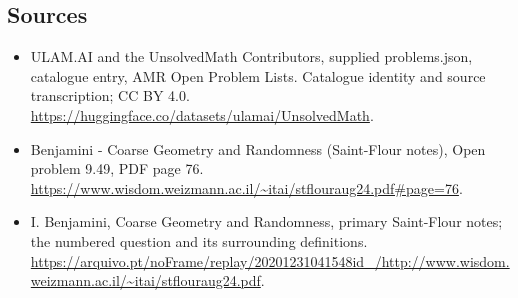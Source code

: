 \documentclass[11pt,a4paper]{article}
\begin{document}
\subsection{Sources}
\begin{itemize}
\item[S1] ULAM.AI and the UnsolvedMath Contributors, supplied problems.json, catalogue entry, AMR Open Problem Lists. Catalogue identity and source transcription; CC BY 4.0.
\url{https://huggingface.co/datasets/ulamai/UnsolvedMath}.
\item[S2] Benjamini - Coarse Geometry and Randomness (Saint-Flour notes), Open problem 9.49, PDF page 76. 
\url{https://www.wisdom.weizmann.ac.il/~itai/stflouraug24.pdf#page=76}.
\item[S3] I. Benjamini, Coarse Geometry and Randomness, primary Saint-Flour notes; the numbered question and its surrounding definitions.
\url{https://arquivo.pt/noFrame/replay/20201231041548id_/http://www.wisdom.weizmann.ac.il/~itai/stflouraug24.pdf}.
\end{itemize}
\end{document}
